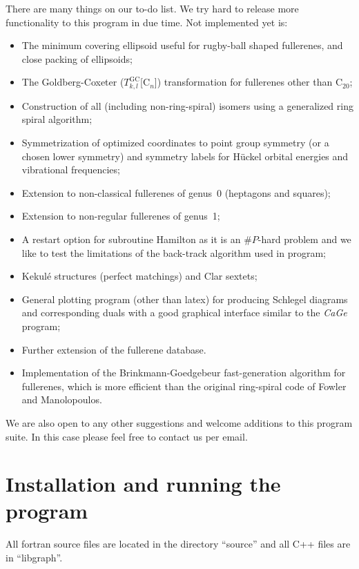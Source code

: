\documentclass[article,a4paper,twoside]{memoir}
\newcommand{\C}[1]{\ensuremath{\mathrm{C}_{#1}}}
\newcommand{\program}[1]{\textit{#1}}
\begin{document}
There are many things on our to-do list. We try hard to release more functionality to this program in due time.
Not implemented yet is: 

\begin{itemize}
\item The minimum covering ellipsoid useful for rugby-ball shaped fullerenes, and close packing of ellipsoids;
\item The Goldberg-Coxeter ($T^\mathrm{GC}_{k,l}$[\C{n}]) transformation for fullerenes other than \C{20};
\item Construction of all (including non-ring-spiral) isomers using a generalized ring spiral algorithm;
\item Symmetrization of optimized coordinates to point group symmetry (or a chosen lower symmetry) and symmetry labels for H\"uckel orbital energies and vibrational frequencies;
\item Extension to non-classical fullerenes of genus~0 (heptagons and squares); 
\item Extension to non-regular fullerenes of genus~1;
\item A restart option for subroutine Hamilton as it is an $\#P$-hard problem and we like to test the limitations of the back-track algorithm used in program;  
\item Kekul\'e structures (perfect matchings) and Clar sextets;
\item General plotting program (other than latex) for producing Schlegel diagrams and corresponding duals with a good graphical interface similar to the \program{CaGe} program;\cite{Brinkmanx}
\item Further extension of the fullerene database.
\item Implementation of the Brinkmann-Goedgebeur fast-generation algorithm for fullerenes, which is more efficient than the original ring-spiral code of Fowler and Manolopoulos.
\end{itemize}

We are also open to any other suggestions and welcome additions to this program suite. In this case please feel free to contact us per email.


\section{Installation and running the program}
All fortran source files are located in the directory ``source'' and all C++ files are in ``libgraph''.
\end{document}
